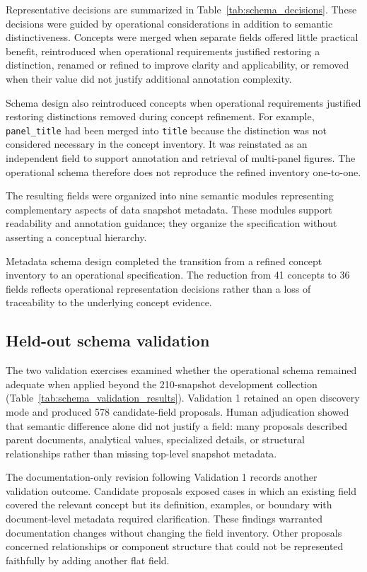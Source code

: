 \documentclass{article}
\begin{document}
Representative decisions are summarized in Table~\ref{tab:schema_decisions}. These decisions were guided by operational considerations in addition to semantic distinctiveness. Concepts were merged when separate fields offered little practical benefit, reintroduced when operational requirements justified restoring a distinction, renamed or refined to improve clarity and applicability, or removed when their value did not justify additional annotation complexity.

Schema design also reintroduced concepts when operational requirements justified restoring distinctions removed during concept refinement. For example, \texttt{panel\_title} had been merged into \texttt{title} because the distinction was not considered necessary in the concept inventory. It was reinstated as an independent field to support annotation and retrieval of multi-panel figures. The operational schema therefore does not reproduce the refined inventory one-to-one.

The resulting fields were organized into nine semantic modules representing complementary aspects of data snapshot metadata. These modules support readability and annotation guidance; they organize the specification without asserting a conceptual hierarchy.

Metadata schema design completed the transition from a refined concept inventory to an operational specification. The reduction from 41 concepts to 36 fields reflects operational representation decisions rather than a loss of traceability to the underlying concept evidence.

\subsection{Held-out schema validation}

The two validation exercises examined whether the operational schema remained adequate when applied beyond the 210-snapshot development collection (Table~\ref{tab:schema_validation_results}). Validation 1 retained an open discovery mode and produced 578 candidate-field proposals. Human adjudication showed that semantic difference alone did not justify a field: many proposals described parent documents, analytical values, specialized details, or structural relationships rather than missing top-level snapshot metadata.

The documentation-only revision following Validation 1 records another validation outcome. Candidate proposals exposed cases in which an existing field covered the relevant concept but its definition, examples, or boundary with document-level metadata required clarification. These findings warranted documentation changes without changing the field inventory. Other proposals concerned relationships or component structure that could not be represented faithfully by adding another flat field.
\end{document}
